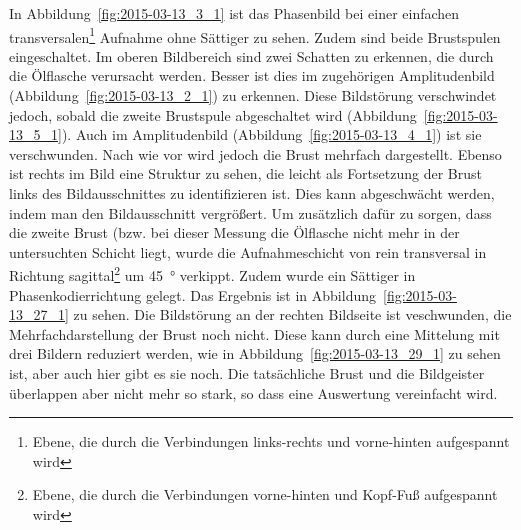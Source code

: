 \documentclass[
    11pt,
    ngerman
]{scrbook}
\begin{document}
In Abbildung~\ref{fig:2015-03-13_3_1} ist das Phasenbild bei einer einfachen
transversalen\footnote{Ebene, die durch die Verbindungen links-rechts und
vorne-hinten aufgespannt wird} Aufnahme ohne Sättiger zu sehen.  Zudem sind
beide Brustspulen eingeschaltet. Im oberen Bildbereich sind zwei Schatten zu
erkennen, die durch die Ölflasche verursacht werden. Besser ist dies im
zugehörigen Amplitudenbild (Abbildung~\ref{fig:2015-03-13_2_1}) zu erkennen.
Diese Bildstörung verschwindet jedoch, sobald die zweite Brustspule
abgeschaltet wird (Abbildung~\ref{fig:2015-03-13_5_1}). Auch im Amplitudenbild
(Abbildung~\ref{fig:2015-03-13_4_1}) ist sie verschwunden. Nach wie vor wird
jedoch die Brust mehrfach dargestellt. Ebenso ist rechts im Bild eine Struktur
zu sehen, die leicht als Fortsetzung der Brust links des Bildausschnittes zu
identifizieren ist. Dies kann abgeschwächt werden, indem man den
Bildausschnitt vergrößert. Um zusätzlich dafür zu sorgen, dass die zweite
Brust (bzw. bei dieser Messung die Ölflasche nicht mehr in der untersuchten
Schicht liegt, wurde die Aufnahmeschicht von rein transversal in Richtung
sagittal\footnote{Ebene, die durch die Verbindungen vorne-hinten und Kopf-Fuß
aufgespannt wird} um \SI{45}{\degree} verkippt. Zudem wurde ein Sättiger in
Phasenkodierrichtung gelegt. Das Ergebnis ist in
Abbildung~\ref{fig:2015-03-13_27_1} zu sehen. Die Bildstörung an der rechten
Bildseite ist veschwunden, die Mehrfachdarstellung der Brust noch nicht. Diese
kann durch eine Mittelung mit drei Bildern reduziert werden, wie in
Abbildung~\ref{fig:2015-03-13_29_1} zu sehen ist, aber auch hier gibt es sie
noch.  Die tatsächliche Brust und die Bildgeister überlappen aber nicht mehr
so stark, so dass eine Auswertung vereinfacht wird.
\end{document}
